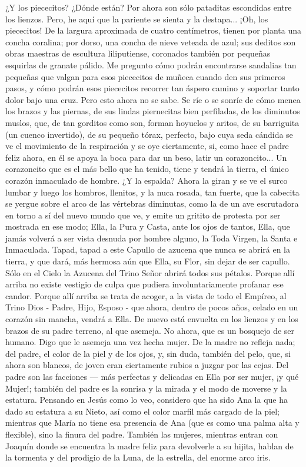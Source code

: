 \documentclass[12pt]{book} %
\begin{document}
 ¿Y los piececitos? ¿Dónde están? Por ahora son sólo pataditas escondidas entre los lienzos. Pero, he aquí que la pariente se sienta y la destapa... ¡Oh, los piececitos! De la largura aproximada de cuatro centímetros, tienen por planta una concha coralina; por dorso, una concha de nieve veteada de azul; sus deditos son obras maestras de escultura liliputiense, coronados también por pequeñas esquirlas de granate pálido. Me pregunto cómo podrán encontrarse sandalias tan pequeñas que valgan para esos piececitos de muñeca cuando den sus primeros pasos, y cómo podrán esos piececitos recorrer tan áspero camino y soportar tanto dolor bajo una cruz. Pero esto ahora no se sabe. Se ríe o se sonríe de cómo menea los brazos y las piernas, de sus lindas piernecitas bien perfiladas, de los diminutos muslos, que, de tan gorditos como son, forman hoyuelos y aritos, de su barriguita (un cuenco invertido), de su pequeño tórax, perfecto, bajo cuya seda cándida se ve el movimiento de la respiración y se oye ciertamente, si, como hace el padre feliz ahora, en él se apoya la boca para dar un beso, latir un corazoncito... Un corazoncito que es el más bello que ha tenido, tiene y tendrá la tierra, el único corazón inmaculado de hombre. ¿Y la espalda? Ahora la giran y se ve el surco lumbar y luego los hombros, llenitos, y la nuca rosada, tan fuerte, que la cabecita se yergue sobre el arco de las vértebras diminutas, como la de un ave escrutadora en torno a sí del nuevo mundo que ve, y emite un gritito de protesta por ser mostrada en ese modo; Ella, la Pura y Casta, ante los ojos de tantos, Ella, que jamás volverá a ser vista desnuda por hombre alguno, la Toda Virgen, la Santa e Inmaculada. Tapad, tapad a este Capullo de azucena que nunca se abrirá en la tierra, y que dará, más hermosa aún que Ella, su Flor, sin dejar de ser capullo. Sólo en el Cielo la Azucena del Trino Señor abrirá todos sus pétalos. Porque allí arriba no existe vestigio de culpa que pudiera involuntariamente profanar ese candor. Porque allí arriba se trata de  acoger, a la vista de todo el Empíreo, al Trino Dios - Padre, Hijo, Esposo - que ahora, dentro de pocos años, celado en un corazón sin mancha, vendrá a Ella. 
De nuevo está envuelta en los lienzos y en los brazos de su padre terreno, al que asemeja. No ahora, que es un 
bosquejo de ser humano. Digo que le asemeja una vez hecha mujer. De la madre no refleja nada; del padre, el color de la piel y de los ojos, y, sin duda, también del pelo, que, si ahora son blancos, de joven eran ciertamente rubios a juzgar por las cejas. Del padre son las facciones — más perfectas y delicadas en Ella por ser mujer, ¡y qué Mujer!; también del padre es la sonrisa y la mirada y el modo de moverse y la estatura. Pensando en Jesús como lo veo, considero que ha sido Ana la que ha dado su estatura a su Nieto, así como el color marfil más cargado de la piel; mientras que María no tiene esa presencia de Ana (que es como una palma alta y flexible), sino la finura del padre. También las mujeres, mientras entran con Joaquín donde se encuentra la madre feliz para devolverle a su hijita, hablan de la tormenta y del prodigio de la Luna, de la estrella, del enorme arco iris. 
\end{document}
